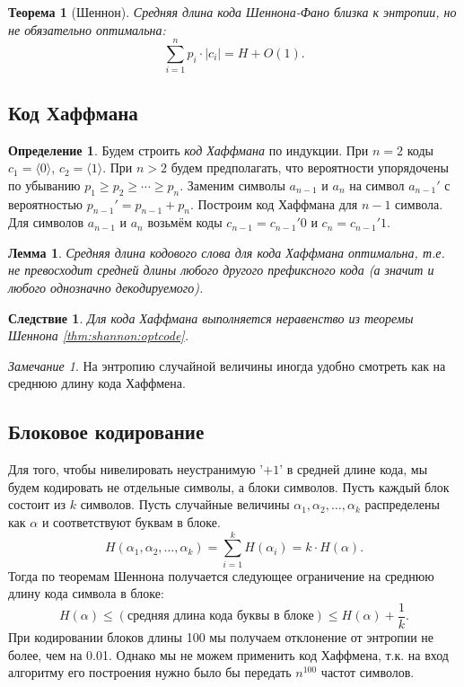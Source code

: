 \documentclass[12pt]{article}
\newcommand{\seqn}[2]{{#1}_1,{#1}_2,\dotsc,{#1}_{#2}}
\theoremstyle{definition}
\newtheorem{definition}{Определение}
\theoremstyle{plain}
\newtheorem{theorem}{Теорема}[section]
\newtheorem{lemma}{Лемма}[section]
\newtheorem{corollary}{Следствие}[section]
\theoremstyle{remark}
\newtheorem{remark}{Замечание}[section]
\begin{document}
\begin{theorem}[Шеннон]
    Средняя длина кода Шеннона-Фано близка к энтропии, но не обязательно
    оптимальна:
    \[
        \sum_{i=1}^n p_i\cdot |c_i| = H + O(1). 
    \]
\end{theorem}
\subsection{Код Хаффмана}
\begin{definition}
    Будем строить \emph{код Хаффмана} по индукции. При $n = 2$ коды $c_1 =
    \langle0\rangle$, $c_2 = \langle1\rangle$. При $n > 2$ будем предполагать,
    что вероятности упорядочены по убыванию $p_1\ge p_2\ge\dotsb\ge p_n$.
    Заменим символы $a_{n-1}$ и $a_n$ на символ $a_{n-1}'$ с вероятностью
    $p_{n-1}' = p_{n-1} + p_n$. Построим код Хаффмана для $n-1$ символа.
    Для символов $a_{n-1}$ и $a_n$ возьмём коды $c_{n-1} = c_{n-1}'0$ и
    $c_{n} = c_{n-1}'1$.
\end{definition}
\begin{lemma}
    Средняя длина кодового слова для кода Хаффмана оптимальна, т.е. не превосходит средней длины
    любого другого префиксного кода (а значит и любого однозначно
    декодируемого).    
\end{lemma}
\begin{corollary}
    Для кода Хаффмана выполняется неравенство из теоремы Шеннона \ref{thm:shannon:optcode}.
\end{corollary}
\begin{remark}
    На энтропию случайной величины иногда удобно смотреть как на среднюю длину
    кода Хаффмена.
\end{remark}

\subsection{Блоковое кодирование}
Для того, чтобы нивелировать неустранимую '$+1$' в средней длине кода, мы будем
кодировать не отдельные символы, а блоки символов.
Пусть каждый блок состоит из $k$ символов. Пусть случайные величины $\seqn{\alpha}{k}$
распределены как $\alpha$ и соответствуют буквам в блоке. 
\[
    H(\seqn{\alpha}{k}) = \sum_{i=1}^k H(\alpha_i) = k\cdot H(\alpha).
\]
Тогда по теоремам Шеннона получается
следующее ограничение на среднюю длину кода символа в блоке:               
\[
    H(\alpha)\le (\text{средняя длина кода буквы в блоке})\le H(\alpha) +
    \frac{1}{k}.
\]
При кодировании блоков длины 100 мы получаем отклонение от энтропии не
более, чем на 0.01. Однако мы не можем применить код Хаффмена, т.к. на
вход алгоритму его построения нужно было бы передать $n^{100}$ частот
символов.
\end{document}
